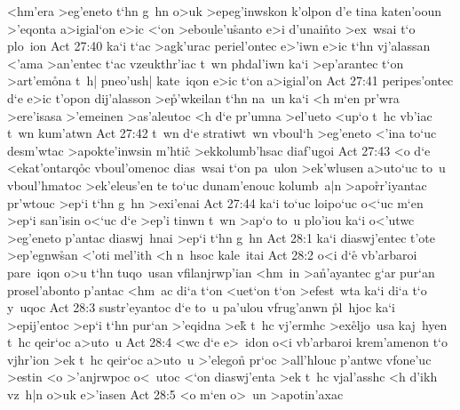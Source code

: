 <hm'era
>eg'eneto
t`hn
g~hn
o>uk
>epeg'inwskon
k'olpon
d'e
tina
katen'ooun
>'eqonta
a>igial`on
e>ic
<`on
>eboule'u\r{s}anto
e>i
d'unai\r{n}to
>ex~wsai
t`o
plo~ion\bibvsend
\vs Act 27:40
ka`i
t`ac
>agk'urac
periel'ontec
e>'iwn
e>ic
t`hn
vj'alassan
<'ama
>an'entec
t`ac
vzeukthr'iac
t~wn
phdal'iwn
ka`i
>ep'arantec
t`on
>art'em\r{o}na
t~h|
pneo'ush|
kate~iqon
e>ic
t`on
a>igial'on\bibvsend
\vs Act 27:41
peripes'ontec
d`e
e>ic
t'opon
dij'alasson
>e\r{p}'wkeilan
t`hn
na~un
ka`i
<h
m`en
pr'wra
>ere'isasa
>'emeinen
>as'aleutoc
<h
d`e
pr'umna
>el'ueto
<up`o
t~hc
vb'iac
t~wn
kum'atwn\bibvsend
\vs Act 27:42
t~wn
d`e
stratiwt~wn
vboul`h
>eg'eneto
<'ina
to`uc
desm'wtac
>apokte'inwsin
m'htic\r{}
>ekkolumb'hsac
diaf'ugoi\bibvsend
\vs Act 27:43
<o
d`e
<ekat'ontarq\r{o}c
vboul'omenoc
dias~wsai
t`on
pa~ulon
>ek'wlusen
a>uto`uc
to~u
vboul'hmatoc
>ek'eleus'en
te
to`uc
dunam'enouc
kolumb~a|n
>apo\r{r}r'iyantac
pr'wtouc
>ep`i
t`hn
g~hn
>exi'enai\bibvsend
\vs Act 27:44
ka`i
to`uc
loipo`uc
o<`uc
m`en
>ep`i
san'isin
o<`uc
d`e
>ep'i
tinwn
t~wn
>ap`o
to~u
plo'iou
ka`i
o<'utwc
>eg'eneto
p'antac
diaswj~hnai
>ep`i
t`hn
g~hn\bibvsend
\vs Act 28:1
ka`i
diaswj'entec
t'ote
>ep'egnw\r{s}an
<'oti
mel'ith
<h
n~hsoc
kale~itai\bibvsend
\vs Act 28:2
o<i
d`e\r{}
vb'arbaroi
pare~iqon
o>u
t`hn
tuqo~usan
vfilanjrwp'ian
<hm~in
>a\-\r{n}'a\-yan\-tec
g`ar
pur`an
prosel'abonto
p'antac
<hm~ac
di`a
t`on
<uet`on
t`on
>efest~wta
ka`i
di`a
t`o
y~uqoc\bibvsend
\vs Act 28:3
sustr'eyantoc
d`e
to~u
pa'ulou
vfrug'anwn
\r{p}l~hjoc
ka`i
>epij'entoc
>ep`i
t`hn
pur`an
>'eqidna
>e\r{k}
t~hc
vj'ermhc
>ex\r{e}ljo~usa
kaj~hyen
t~hc
qeir`oc
a>uto~u\bibvsend
\vs Act 28:4
<wc
d`e
e>~idon
o<i
vb'arbaroi
krem'amenon
t`o
vjhr'ion
>ek
t~hc
qeir`oc
a>uto~u
>'elegon\r{}
pr`oc
>all'hlouc
p'antwc
vfone'uc
>estin
<o
>'anjrwpoc
o<~utoc
<`on
diaswj'enta
>ek
t~hc
vjal'asshc
<h
d'ikh
vz~h|n
o>uk
e>'iasen\bibvsend
\vs Act 28:5
<o
m`en
o>~un
>apotin'axac
